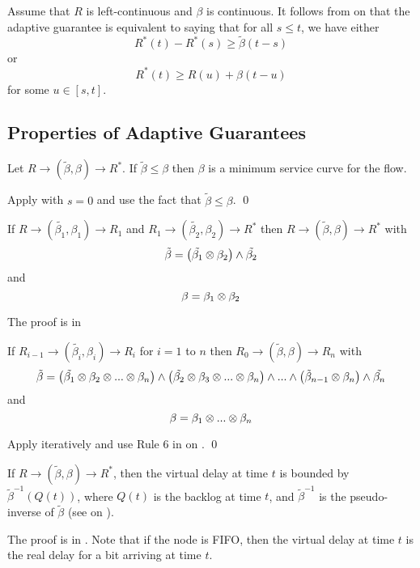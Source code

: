 Assume that $R$ is left-continuous and $\beta$ is continuous.
It follows from  on
 that the adaptive guarantee is
equivalent to saying that for all $s \leq t$, we have either
$$
R^*(t) - R^*(s) \geq \tilde{\beta}(t-s)
$$
or
$$
R^*(t) \geq R(u) + \beta(t-u)
$$
for some $u \in [s,t]$.
\subsection{Properties of Adaptive
Guarantees} 
\begin{theorem}
Let $R \rightarrow (\tilde{\beta}, \beta) \rightarrow R^*$. If
$\tilde{\beta} \leq \beta$ then $\beta$ is a minimum service
curve for the flow. 
\end{theorem}
\pr Apply  with $s=0$ and use the fact that
$\tilde{\beta} \leq \beta$.
 \qed



\begin{theorem}[Concatenation]
If $R \rightarrow (\tilde{\beta_1}, \beta_1) \rightarrow R_1$
and $R_1 \rightarrow (\tilde{\beta_2}, \beta_2) \rightarrow
R^*$ then $R \rightarrow (\tilde{\beta}, \beta) \rightarrow
R^*$ with
$$
\tilde{\beta}=\left( \tilde{\beta_1} \otimes \beta_2 \right)
\wedge \tilde{\beta_2}
$$
and
$$
\beta= \beta_1 \otimes \beta_2
$$
\end{theorem}
The proof is in 
 \begin{corollary}
If $R_{i-1} \rightarrow (\tilde{\beta_i}, \beta_i) \rightarrow
R_i$ for $i=1$ to $n$ then $R_0 \rightarrow (\tilde{\beta},
\beta) \rightarrow R_n$ with
$$
\tilde{\beta}= \left( \tilde{\beta_1} \otimes \beta_2 \otimes ...
\otimes \beta_n \right)
 \wedge
 \left( \tilde{\beta_2} \otimes \beta_3 \otimes
... \otimes \beta_n \right)
 \wedge
 ...
 \wedge
 \left( \tilde{\beta}_{n-1} \otimes \beta_n \right)
 \wedge
 \tilde{\beta_n}
$$
and
$$
\beta= \beta_1 \otimes ... \otimes \beta_n
$$
 \end{corollary}
 \pr
 Apply  iteratively and use
Rule 6 in  on . \qed

\begin{theorem}
If $R \rightarrow (\tilde{\beta}, \beta) \rightarrow R^*$,
then the virtual delay at time $t$ is bounded by
$\tilde{\beta}^{-1}(Q(t))$, where $Q(t)$ is the backlog at
time $t$, and $\tilde{\beta}^{-1}$ is the pseudo-inverse of
$\tilde{\beta}$ (see  on
).
\end{theorem}
The proof is in . Note that if the node is
FIFO, then the virtual delay at time $t$ is the real delay for
a bit arriving at time $t$.

